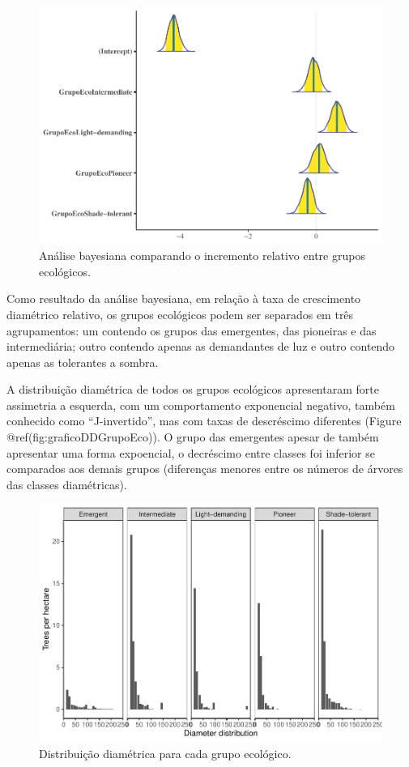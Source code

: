 \documentclass[
]{article}
\begin{document}
\begin{figure}
\centering
\includegraphics{manuscript_files/figure-latex/testeIncGrupoEco-1.pdf}
\caption{Análise bayesiana comparando o incremento relativo entre grupos
ecológicos.}
\end{figure}

Como resultado da análise bayesiana, em relação à taxa de crescimento
diamétrico relativo, os grupos ecológicos podem ser separados em três
agrupamentos: um contendo os grupos das emergentes, das pioneiras e das
intermediária; outro contendo apenas as demandantes de luz e outro
contendo apenas as tolerantes a sombra.

A distribuição diamétrica de todos os grupos ecológicos apresentaram
forte assimetria a esquerda, com um comportamento exponencial negativo,
também conhecido como ``J-invertido'', mas com taxas de descréscimo
diferentes (Figure @ref(fig:graficoDDGrupoEco)). O grupo das emergentes
apesar de também apresentar uma forma expoencial, o decréscimo entre
classes foi inferior se comparados aos demais grupos (diferenças menores
entre os números de árvores das classes diamétricas).

\begin{figure}
\centering
\includegraphics{manuscript_files/figure-latex/graficoDDGrupoEco-1.pdf}
\caption{Distribuição diamétrica para cada grupo ecológico.}
\end{figure}
\end{document}
